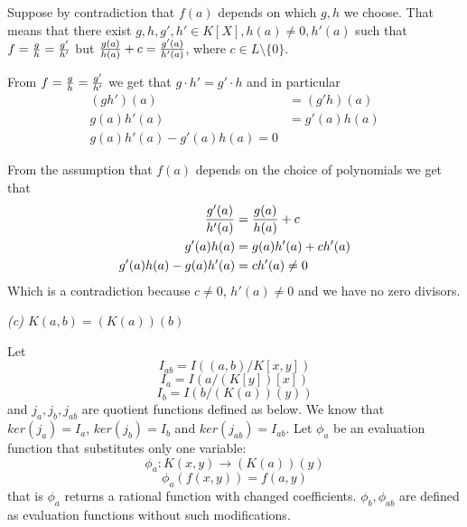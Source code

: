 \documentclass{article}
\begin{document}
Suppose by contradiction that $f(a)$ depends on which $g,h$ we choose. That means that there exist $g,h, g',h'\in K[X], h(a)\neq 0, h'(a)$ such that $f={g\over h}={g'\over h'}$ but ${g(a)\over h(a)}+c= {g'(a)\over h'(a)}$, where $c\in L\setminus\{0\}$. 

From $f={g\over h}={g'\over h'}$ we get that $g\cdot h'=g'\cdot h$ and in particular
\begin{align*}
    (gh')(a)&=(g'h)(a)\\
    g(a)h'(a)&=g'(a)h(a)\\
    g(a)h'(a)-g'(a)h(a)=0
\end{align*}

From the assumption that $f(a)$ depends on the choice of polynomials we get that 
\begin{align*}
    {g'(a)\over h'(a)}&={g(a)\over h(a)}+c\\
    g'(a)h(a)&=g(a)h'(a)+ch'(a)\\
    g'(a)h(a)-g(a)h'(a)&=ch'(a)\neq 0
\end{align*}
Which is a contradiction because $c\neq 0$, $h'(a)\neq 0$ and we have no zero divisors.
\smallskip

\emph{(c) $K(a, b)=(K(a))(b)$}
\smallskip

Let 
$$I_{ab}=I((a, b)/K[x, y])$$
$$I_a=I(a/(K[y])[x])$$
$$I_b=I(b/(K(a))(y))$$
and $j_a,j_b, j_{ab}$ are quotient functions defined as below. We know that $ker(j_a)=I_a$, $ker(j_b)=I_b$ and $ker(j_{ab})=I_{ab}$. Let $\phi_a$ be an evaluation function that substitutes only one variable:
$$\phi_a:K(x, y)\to (K(a))(y)$$
$$\phi_a(f(x, y))=f(a, y)$$
that is $\phi_a$ returns a rational function with changed coefficients. $\phi_b, \phi_{ab}$ are defined as evaluation functions without such modifications.

\begin{center}\end{center}
\end{document}
